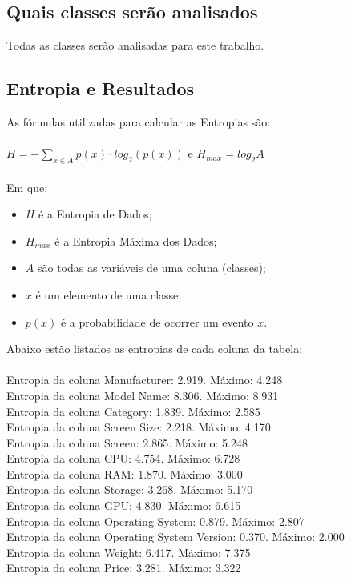 \documentclass{report}
\begin{document}
\subsection{Quais classes serão analisados}
Todas as classes serão analisadas para este trabalho.

\subsection{Entropia e Resultados}
As fórmulas utilizadas para calcular as Entropias são: \\\\
$H=-\sum\limits_{x\in A}p(x)\cdot log_{2}(p(x))$ e $H_{max}=log_{2}A$\\\\
Em que:
\begin{itemize}
    \item $H$ é a Entropia de Dados;
    \item $H_{max}$ é a Entropia Máxima dos Dados;
    \item $A$ são todas as variáveis de uma coluna (classes);
    \item $x$ é um elemento de uma classe;
    \item $p(x)$ é a probabilidade de ocorrer um evento $x$.
\end{itemize}
Abaixo estão listados as entropias de cada coluna da tabela:\\\\
Entropia da coluna Manufacturer: 2.919. Máximo: 4.248\\
Entropia da coluna Model Name: 8.306. Máximo: 8.931\\
Entropia da coluna Category: 1.839. Máximo: 2.585\\
Entropia da coluna Screen Size: 2.218. Máximo: 4.170\\
Entropia da coluna Screen: 2.865. Máximo: 5.248\\
Entropia da coluna CPU: 4.754. Máximo: 6.728\\
Entropia da coluna RAM: 1.870. Máximo: 3.000\\
Entropia da coluna Storage: 3.268. Máximo: 5.170\\
Entropia da coluna GPU: 4.830. Máximo: 6.615\\
Entropia da coluna Operating System: 0.879. Máximo: 2.807\\
Entropia da coluna Operating System Version: 0.370. Máximo: 2.000\\
Entropia da coluna Weight: 6.417. Máximo: 7.375\\
Entropia da coluna Price: 3.281. Máximo: 3.322\\
\end{document}
